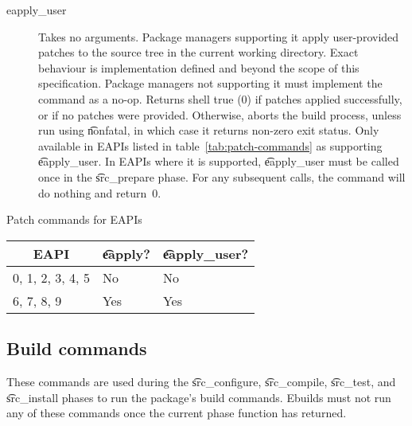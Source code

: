\begin{description}
\item[eapply_user]  Takes no arguments. Package managers supporting it
    apply user-provided patches to the source tree in the current working directory. Exact behaviour
    is implementation defined and beyond the scope of this specification. Package managers not
    supporting it must implement the command as a no-op. Returns shell true (0) if patches applied
    successfully, or if no patches were provided. Otherwise, aborts the build process, unless run
    using \t{nonfatal}, in which case it returns non-zero exit status. Only available in EAPIs
    listed in table~\ref{tab:patch-commands} as supporting \t{eapply_user}. In EAPIs where it is
    supported, \t{eapply_user} must be called once in the \t{src_prepare} phase. For any
    subsequent calls, the command will do nothing and return~0.
\end{description}

\begin{centertable}{Patch commands for EAPIs}
    \label{tab:patch-commands}
    \begin{tabular}{lll}
      \toprule
      \multicolumn{1}{c}{\textbf{EAPI}} &
      \multicolumn{1}{c}{\textbf{\t{eapply}?}} &
      \multicolumn{1}{c}{\textbf{\t{eapply_user}?}} \\
      \midrule
      0, 1, 2, 3, 4, 5  & No  & No  \\
      6, 7, 8, 9        & Yes & Yes \\
      \bottomrule
    \end{tabular}
\end{centertable}

\subsection{Build commands}
\label{sec:build-commands}
These commands are used during the \t{src_configure}, \t{src_compile}, \t{src_test},
and \t{src_install} phases to run the package's build commands. Ebuilds must not run any of these
commands once the current phase function has returned.

